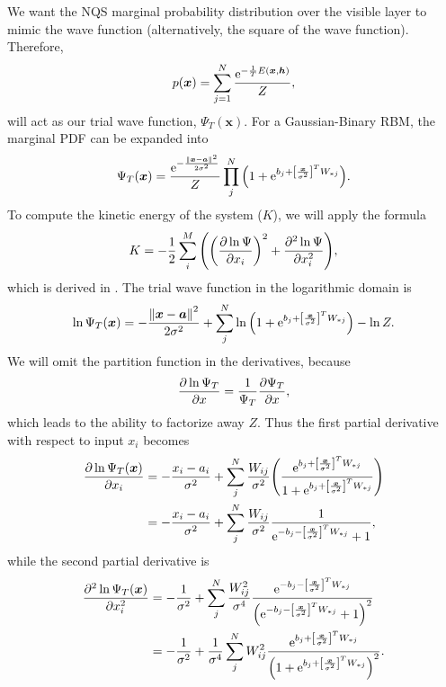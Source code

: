 We want the NQS marginal probability distribution over the visible layer to mimic the wave function (alternatively, the square of the wave function). Therefore, 
\begin{equation*}
    p(\bm{x}) = \sum_{j=1}^N \frac{\mathrm{e}^{-\frac{1}{T}E\qty(\bm{x}, \bm{h})}}{Z}, 
\end{equation*}
will act as our trial wave function, $\Psi_T(\bm{x})$. For a Gaussian-Binary RBM, the marginal PDF can be expanded into
\begin{equation*}
    \Psi_T(\bm{x}) = \frac{\mathrm{e}^{-\frac{\norm{\bm{x}-\bm{a}}^2}{2\sigma^2}}}{Z}\prod_j^N \qty(1 + \mathrm{e}^{b_j + \qty[\frac{\bm{x}}{\sigma^2}]^T W_{*j}}). 
\end{equation*}
To compute the kinetic energy of the system ($K$), we will apply the formula 
\begin{equation*}
    K = -\frac{1}{2}\sum_i^M \qty(\qty(\pdv{\ln{\Psi}}{x_i})^2 + \pdv[2]{\ln{\Psi}}{x_i}), 
\end{equation*}
which is derived in \citep{project1}. The trial wave function in the logarithmic domain is 
\begin{equation*}
    \ln{\Psi_T\qty(\bm{x})} = -\frac{\norm{\bm{x}-\bm{a}}^2}{2\sigma^2} + \sum_j^N \ln{\qty(1+\mathrm{e}^{b_j + \qty[\frac{\bm{x}}{\sigma^2}]^T W_{*j}})} - \ln{Z}. 
\end{equation*}
We will omit the partition function in the derivatives, because 
\begin{equation*}
    \pdv{\ln{\Psi_T}}{x} = \frac{1}{\Psi_T}\pdv{\Psi_T}{x}, 
\end{equation*}
which leads to the ability to factorize away $Z$. 
Thus the first partial derivative with respect to input $x_i$ becomes 
\begin{align*}
    \pdv{\ln{\Psi_T\qty(\bm{x})}}{x_i} &= -\frac{x_i-a_i}{\sigma^2} + \sum_j^N\frac{W_{ij}}{\sigma^2}\qty(\frac{\mathrm{e}^{b_j + \qty[\frac{\bm{x}}{\sigma^2}]^T W_{*j}}}{1+\mathrm{e}^{b_j + \qty[\frac{\bm{x}}{\sigma^2}]^T W_{*j}}}) \\
    &= -\frac{x_i-a_i}{\sigma^2} + \sum_j^N\frac{W_{ij}}{\sigma^2}\frac{1}{\mathrm{e}^{-b_j-\qty[\frac{\bm{x}}{\sigma^2}]^TW_{*j}}+1}, 
\end{align*}
while the second partial derivative is
\begin{align*}
    \pdv[2]{\ln{\Psi_T\qty(\bm{x})}}{x_i} &= -\frac{1}{\sigma^2} + \sum_j^N \frac{W_{ij}^2}{\sigma^4} \frac{\mathrm{e}^{-b_j-\qty[\frac{\bm{x}}{\sigma^2}]^TW_{*j}}}{\qty(\mathrm{e}^{-b_j-\qty[\frac{\bm{x}}{\sigma^2}]^TW_{*j}} + 1)^2} \\
   &= -\frac{1}{\sigma^2} + \frac{1}{\sigma^4}\sum_j^N W_{ij}^2 \frac{\mathrm{e}^{b_j+\qty[\frac{\bm{x}}{\sigma^2}]^TW_{*j}}}{\qty(1 + \mathrm{e}^{b_j+\qty[\frac{\bm{x}}{\sigma^2}]^TW_{*j}})^2}. 
\end{align*}
